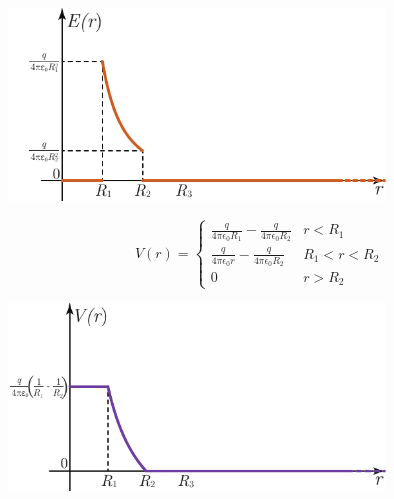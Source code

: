 \begin{center}
	\includegraphics[width=0.75\textwidth]{images/chp4sferacava4graf1.pdf}
\end{center}
\begin{equation*}
	V(r)=\begin{cases}
		\frac{q}{4\pi\epsilon_0R_1}-\frac{q}{4\pi\epsilon_0R_2} & r<R_1\\
		\frac{q}{4\pi\epsilon_0r}-\frac{q}{4\pi\epsilon_0R_2} & R_1<r<R_2\\
		0 & r>R_2
	\end{cases}
\end{equation*}
\begin{center}
	\includegraphics[width=0.75\textwidth]{images/chp4sferacava4graf2.pdf}
\end{center}
